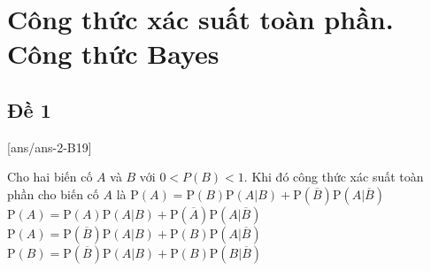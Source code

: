 \section{Công thức xác suất toàn phần. Công thức Bayes}
\subsection{Đề 1}
[ans/ans-2-B19]
\caulc
\begin{ex}%
Cho hai biến cố $A$ và $B$ với $0<P(B)<1$. Khi đó công thức xác suất toàn phần cho biến cố $A$ là
	\choice
	{\True $\mathrm{P}(A)=\mathrm{P}(B)\mathrm{P}(A|B)+\mathrm{P}(\overline{B})\mathrm{P}(A|\overline{B})$}
	{$\mathrm{P}(A)=\mathrm{P}(A)\mathrm{P}(A|B)+\mathrm{P}(\overline{A})\mathrm{P}(A|\overline{B})$}
	{$\mathrm{P}(A)=\mathrm{P}(\overline{B})\mathrm{P}(A|B)+\mathrm{P}(B)\mathrm{P}(A|\overline{B})$}
	{$\mathrm{P}(B)=\mathrm{P}(\overline{B})\mathrm{P}(A|B)+\mathrm{P}(B)\mathrm{P}(B|\overline{B})$}
\end{ex}	

